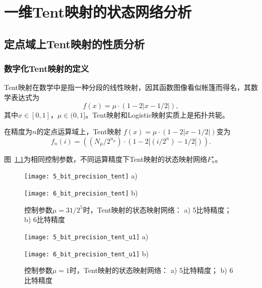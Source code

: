 \chapter{一维Tent映射的状态网络分析}

\section{定点域上Tent映射的性质分析}

\subsection{数字化Tent映射的定义}

Tent映射在数学中是指一种分段的线性映射，因其函数图像看似帐篷而得名，其数学表达式为
\begin{equation}
f(x)=\mu \cdot\left(1-2\left|x-1/2\right|\right),
\label{eq:Tent}
\end{equation}
其中$x\in [0,1]$，$\mu\in (0,1]$。Tent映射和Logistic映射实质上是拓扑共轭。

在精度为$n$的定点运算域上，Tent映射
$f(x)=\mu \cdot\left(1-2\left|x-1/2\right|\right)$变为
\begin{equation}
f_n(i)=\left( (N_{\mu}/2^{n_\mu}) \cdot (1-2\left|(i/2^n)-1/2\right|) \right).
\label{eq:TentFinite}
\end{equation}

图~\ref{fig:networkTent5and6bits}为相同控制参数，不同运算精度下Tent映射的状态映射网络$F^\star_n$。

\begin{figure}[!htb]
\centering
\begin{minipage}{0.87\BigTwoImW}
\centering
\texttt{[image: 5\_bit\_precision\_tent]}
a)
\end{minipage}\hspace{\figsep}
\begin{minipage}{\BigTwoImW}
\centering
\texttt{[image: 6\_bit\_precision\_tent]}
b)
\end{minipage}
\caption{控制参数$\mu=31/2^5$时，Tent映射的状态映射网络：
a) 5比特精度； b) 6比特精度}
\label{fig:networkTent5and6bits}
\end{figure}

\begin{figure}[!htb]
\centering
\begin{minipage}{0.93\BigTwoImW}
\centering
\texttt{[image: 5\_bit\_precision\_tent\_u1]}
a)
\end{minipage}\hspace{\figsep}
\begin{minipage}{\BigTwoImW}
\centering
\texttt{[image: 6\_bit\_precision\_tent\_u1]}
b)
\end{minipage}
\caption{控制参数$\mu=1$时，Tent映射的状态映射网络：
a) 5比特精度； b) 6比特精度}
\label{fig:networktent5and6bitsu1}
\end{figure}

